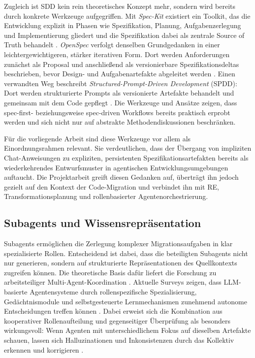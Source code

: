 Zugleich ist SDD kein rein theoretisches Konzept mehr, sondern wird bereits durch konkrete Werkzeuge aufgegriffen. Mit \emph{Spec-Kit} existiert ein Toolkit, das die Entwicklung explizit in Phasen wie Spezifikation, Planung, Aufgabenzerlegung und Implementierung gliedert und die Spezifikation dabei als zentrale Source of Truth behandelt \parencite{githubspeckit,delimarsky2025speckit}. \emph{OpenSpec} verfolgt denselben Grundgedanken in einer leichtergewichtigeren, stärker iterativen Form. Dort werden Anforderungen zunächst als Proposal und anschließend als versionierbare Spezifikationsdeltas beschrieben, bevor Design- und Aufgabenartefakte abgeleitet werden \parencite{openspec}. Einen verwandten Weg beschreibt \emph{Structured-Prompt-Driven Development} (SPDD): Dort werden strukturierte Prompts als versionierte Artefakte behandelt und gemeinsam mit dem Code gepflegt \parencite{zhang2026spdd}. Die Werkzeuge und Ansätze zeigen, dass spec-first- beziehungsweise spec-driven Workflows bereits praktisch erprobt werden und sich nicht nur auf abstrakte Methodendiskussionen beschränken.

Für die vorliegende Arbeit sind diese Werkzeuge vor allem als Einordnungsrahmen relevant. Sie verdeutlichen, dass der Übergang von impliziten Chat-Anweisungen zu expliziten, persistenten Spezifikationsartefakten bereits als wiederkehrendes Entwurfsmuster in agentischen Entwicklungsumgebungen auftaucht. Die Projektarbeit greift diesen Gedanken auf, überträgt ihn jedoch gezielt auf den Kontext der Code-Migration und verbindet ihn mit RE, Transformationsplanung und rollenbasierter Agentenorchestrierung.

\subsection{Subagents und Wissensrepräsentation}

Subagents ermöglichen die Zerlegung komplexer Migrationsaufgaben in klar spezialisierte Rollen. Entscheidend ist dabei, dass die beteiligten Subagents nicht nur generieren, sondern auf strukturierte Repräsentationen des Quellkontexts zugreifen können. Die theoretische Basis dafür liefert die Forschung zu arbeitsteiliger Multi-Agent-Koordination \parencite{wooldridge2009multiagent}. Aktuelle Surveys zeigen, dass LLM-basierte Agentensysteme durch rollenspezifische Spezialisierung, Gedächtnismodule und selbstgesteuerte Lernmechanismen zunehmend autonome Entscheidungen treffen können \parencite{wang2025surveyagents,xi2023riseagents}. Dabei erweist sich die Kombination aus kooperativer Rollenaufteilung und gegenseitiger Überprüfung als besonders wirkungsvoll: Wenn Agenten mit unterschiedlichem Fokus auf dieselben Artefakte schauen, lassen sich Halluzinationen und Inkonsistenzen durch das Kollektiv erkennen und korrigieren \parencite{xi2023riseagents}.


